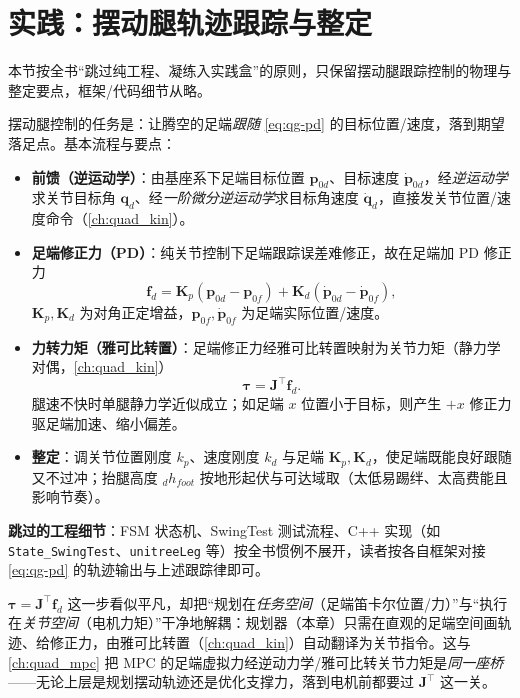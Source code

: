 \section{实践：摆动腿轨迹跟踪与整定}
\label{sec:qg-practice}

本节按全书“跳过纯工程、凝练入实践盒”的原则，只保留摆动腿跟踪控制的物理与整定要点，框架/代码细节从略。

\begin{practice}[摆动腿轨迹跟踪：足端 PD + $\boldsymbol{\tau}=\mathbf{J}^\top\mathbf{f}$]
摆动腿控制的任务是：让腾空的足端\emph{跟随} \cref{eq:qg-pd} 的目标位置/速度，落到期望落足点。基本流程与要点：
\begin{itemize}
  \item \textbf{前馈（逆运动学）}：由基座系下足端目标位置 $\boldsymbol{p}_{0d}$、目标速度 $\dot{\boldsymbol{p}}_{0d}$，经\emph{逆运动学}求关节目标角 $\boldsymbol{q}_d$、经\emph{一阶微分逆运动学}求目标角速度 $\dot{\boldsymbol{q}}_d$，直接发关节位置/速度命令（\cref{ch:quad_kin}）。
  \item \textbf{足端修正力（PD）}：纯关节控制下足端跟踪误差难修正，故在足端加 PD 修正力\cite{unitree2023quadruped}
  \[
    \boldsymbol{f}_d=\boldsymbol{K}_p(\boldsymbol{p}_{0d}-\boldsymbol{p}_{0f})+\boldsymbol{K}_d(\dot{\boldsymbol{p}}_{0d}-\dot{\boldsymbol{p}}_{0f}),
  \]
  $\boldsymbol{K}_p,\boldsymbol{K}_d$ 为对角正定增益，$\boldsymbol{p}_{0f},\dot{\boldsymbol{p}}_{0f}$ 为足端实际位置/速度。
  \item \textbf{力转力矩（雅可比转置）}：足端修正力经雅可比转置映射为关节力矩（静力学对偶，\cref{ch:quad_kin}）
  \[
    \boldsymbol{\tau}=\boldsymbol{J}^\top\boldsymbol{f}_d.
  \]
  腿速不快时单腿静力学近似成立；如足端 $x$ 位置小于目标，则产生 $+x$ 修正力驱足端加速、缩小偏差\cite{unitree2023quadruped}。
  \item \textbf{整定}：调关节位置刚度 $k_p$、速度刚度 $k_d$ 与足端 $\boldsymbol{K}_p,\boldsymbol{K}_d$，使足端既能良好跟随又不过冲；抬腿高度 ${}_dh_{foot}$ 按地形起伏与可达域取（太低易踢绊、太高费能且影响节奏）。
\end{itemize}
\textbf{跳过的工程细节}：FSM 状态机、SwingTest 测试流程、C++ 实现（如 \texttt{State\_SwingTest}、\texttt{unitreeLeg} 等）按全书惯例不展开，读者按各自框架对接 \cref{eq:qg-pd} 的轨迹输出与上述跟踪律即可。
\end{practice}

\begin{insight}[力—力矩对偶把规划与执行解耦]\label{ins:qg-jacobian}
$\boldsymbol{\tau}=\boldsymbol{J}^\top\boldsymbol{f}_d$ 这一步看似平凡，却把“规划在\emph{任务空间}（足端笛卡尔位置/力）”与“执行在\emph{关节空间}（电机力矩）”干净地解耦：规划器（本章）只需在直观的足端空间画轨迹、给修正力，由雅可比转置（\cref{ch:quad_kin}）自动翻译为关节指令。这与 \cref{ch:quad_mpc} 把 MPC 的足端虚拟力经逆动力学/雅可比转关节力矩是\emph{同一座桥}——无论上层是规划摆动轨迹还是优化支撑力，落到电机前都要过 $\boldsymbol{J}^\top$ 这一关。
\end{insight}

